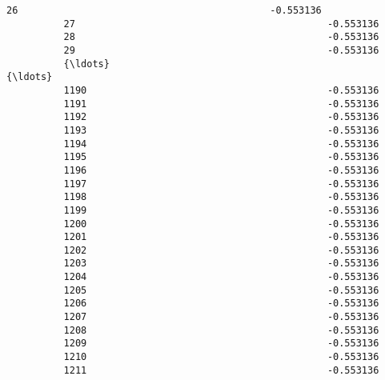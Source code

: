\documentclass[11pt]{article}
\begin{document}
\begin{Verbatim}[commandchars=\\\{\}]
          26                                            -0.553136                               
          27                                            -0.553136                               
          28                                            -0.553136                               
          29                                            -0.553136                               
          {\ldots}                                                 {\ldots}                               
          1190                                          -0.553136                               
          1191                                          -0.553136                               
          1192                                          -0.553136                               
          1193                                          -0.553136                               
          1194                                          -0.553136                               
          1195                                          -0.553136                               
          1196                                          -0.553136                               
          1197                                          -0.553136                               
          1198                                          -0.553136                               
          1199                                          -0.553136                               
          1200                                          -0.553136                               
          1201                                          -0.553136                               
          1202                                          -0.553136                               
          1203                                          -0.553136                               
          1204                                          -0.553136                               
          1205                                          -0.553136                               
          1206                                          -0.553136                               
          1207                                          -0.553136                               
          1208                                          -0.553136                               
          1209                                          -0.553136                               
          1210                                          -0.553136                               
          1211                                          -0.553136                               

\end{Verbatim}
\end{document}

